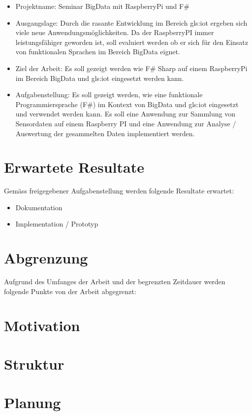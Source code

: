 \begin{itemize}
\item Projektname: Seminar BigData mit RaspberryPi und F\#
\item Ausgangslage: Durch die rasante Entwicklung im Bereich \Gls{gls:iot} ergeben sich viele neue Anwendungsmöglichkeiten. Da der RaspberryPI immer leistungsfähiger geworden ist, soll evaluiert werden ob er sich für den Einsatz von funktionalen Sprachen im Bereich BigData eignet.
\item Ziel der Arbeit: Es soll gezeigt werden wie F\# Sharp auf einem RaspberryPi im Bereich BigData und \Gls{gls:iot} eingesetzt werden kann.
\item Aufgabenstellung: Es soll gezeigt werden, wie eine funktionale Programmiersprache (F\#) im Kontext von BigData und \Gls{gls:iot} eingesetzt und verwendet werden kann. Es soll eine Anwendung zur Sammlung von Sensordaten auf einem Raspberry PI und eine Anwendung zur Analyse / Auswertung der gesammelten Daten implementiert werden.
\end{itemize}


\section{Erwartete Resultate} \label{sec:ErwarteteResultate}
Gemäss freigegebener Aufgabenstellung werden folgende Resultate erwartet:

\begin{itemize}
\item Dokumentation
\item Implementation / Prototyp
\end{itemize}


\section{Abgrenzung} \label{sec:Abgrenzung}
Aufgrund des Umfanges der Arbeit und der begrenzten Zeitdauer werden folgende Punkte von der Arbeit abgegrenzt:

\begin{itemize}

\end{itemize}


\section{Motivation}


\section{Struktur}


\section{Planung} \label{sec:Intro:Planning}
